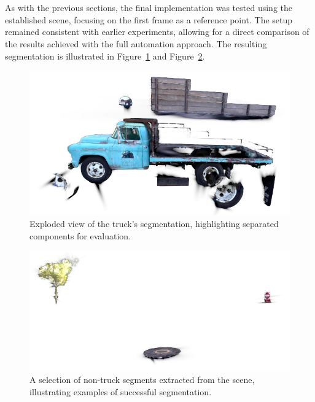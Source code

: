 \documentclass[12pt]{article}
\begin{document}
\\\\
As with the previous sections, the final implementation was tested using the established scene, focusing on the first frame as a reference point. The setup remained consistent with earlier experiments, allowing for a direct comparison of the results achieved with the full automation approach. The resulting segmentation is illustrated in Figure~\ref{fig:truckparts} and Figure~\ref{fig:best}.
\begin{figure}[h!]
	\centering
	\includegraphics[width=\textwidth]{Images/truckparts.png}
	\caption{Exploded view of the truck’s segmentation, highlighting separated components for evaluation.}
	\label{fig:truckparts}
\end{figure}
\begin{figure}[h!]
	\centering
	\includegraphics[width=\textwidth]{Images/best.png}
	\caption{A selection of non-truck segments extracted from the scene, illustrating examples of successful segmentation.}
	\label{fig:best}
\end{figure}
\FloatBarrier
\noindent
\end{document}

